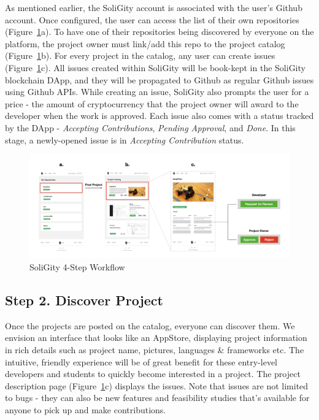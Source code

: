 \documentclass[12pt]{article}
\renewcommand{\_}{\kern-1.5pt\textunderscore\kern-1.5pt}
\begin{document}
As mentioned earlier, the SoliGity account is associated with the user’s Github account. Once configured, the user can access the list of their own repositories (Figure~\ref{fig:workflow2}a). To have one of their repositories being discovered by everyone on the platform, the project owner must link/add this repo to the project catalog (Figure~\ref{fig:workflow2}b). For every project in the catalog, any user can create issues (Figure~\ref{fig:workflow2}c). All issues created within SoliGity will be book-kept in the SoliGity blockchain DApp, and they will be propagated to Github as regular Github issues using Github APIs. While creating an issue, SoliGity also prompts the user for a price - the amount of cryptocurrency that the project owner will award to the developer when the work is approved. Each issue also comes with a status tracked by the DApp - \textit{Accepting Contributions}, \textit{Pending Approval}, and \textit{Done}. In this stage, a newly-opened issue is in \textit{Accepting Contribution} status.


\begin{figure}[h]
    \centering
    \includegraphics[width=16.5cm]{graphs/00b. workflow.jpeg}
    \caption{SoliGity 4-Step Workflow}
    \label{fig:workflow2}
\end{figure}

\subsection*{Step 2. Discover Project}

Once the projects are posted on the catalog, everyone can discover them. We envision an interface that looks like an AppStore, displaying project information in rich details such as project name, pictures, languages \& frameworks etc. The intuitive, friendly experience will be of great benefit for these entry-level developers and students to quickly become interested in a project. The project description page (Figure~\ref{fig:workflow2}c) displays the issues. Note that issues are not limited to bugs - they can also be new features and feasibility studies that’s available for anyone to pick up and make contributions. 
\end{document}
